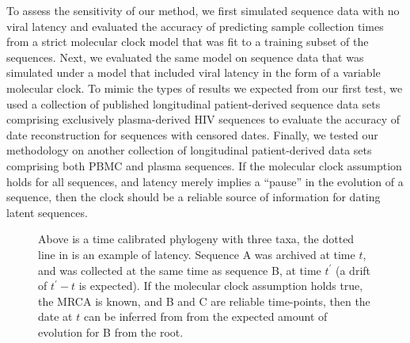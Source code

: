 To assess the sensitivity of our method, we first simulated sequence data with no viral latency and evaluated the accuracy of predicting sample collection times from a strict molecular clock model that was fit to a training subset of the sequences. 
Next, we evaluated the same model on sequence data that was simulated under a model that included viral latency in the form of a variable molecular clock.
To mimic the types of results we expected from our first test, we used a collection of published longitudinal patient-derived sequence data sets comprising exclusively plasma-derived HIV sequences \citep{McCloskey14} to evaluate the accuracy of date reconstruction for sequences with censored dates. 
Finally, we tested our methodology on another collection of longitudinal patient-derived data sets comprising both PBMC and plasma sequences. 
If the molecular clock assumption holds for all sequences, and latency merely implies a ``pause'' in the evolution of a sequence, then the clock should be a reliable source of information for dating latent sequences.

\begin{figure} \label{fig:latenttree}
	\centering
	\scalebox{5}{}
	\caption[Example of latent behavior]{ Above is a time calibrated phylogeny with three taxa, the dotted line in is an example of latency. 
	Sequence A was archived at time $t$, and was collected at the same time as sequence B, at time $t^\prime$ (a drift of $t^\prime - t$ is expected).
	If the molecular clock assumption holds true, the MRCA is known, and B and C are reliable time-points, then the date at $t$ can be inferred from from the expected amount of evolution for B from the root.}
\end{figure}
